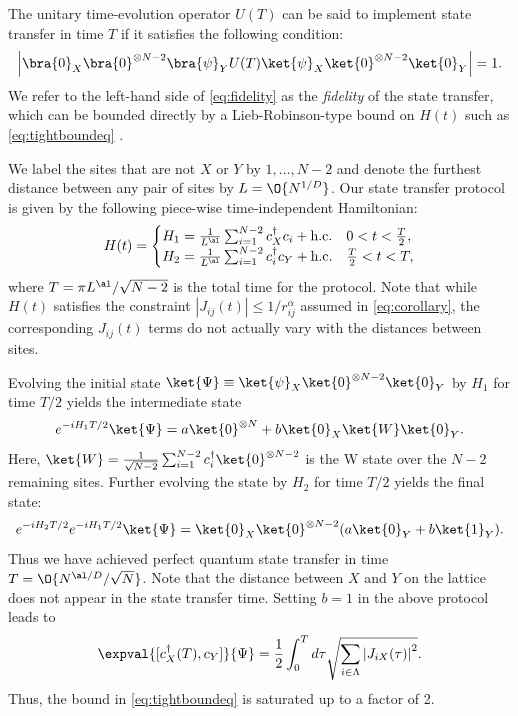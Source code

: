 The unitary time-evolution operator $U(T)$ can be said to implement state transfer in time $T$ if it satisfies the following condition:
\begin{align}
	\label{eq:fidelity}
	\left|\bra{0}_{X}\bra{0}^{\otimes N-2}\bra{\psi}_{Y} U(T)\ket{\psi}_{X}\ket{0}^{\otimes N-2}\ket{0}_{Y}\right| = 1.
 \end{align}
We refer to the left-hand side of \cref{eq:fidelity} as the \emph{fidelity} of the state transfer, which can be bounded directly by a Lieb-Robinson-type bound on $H(t)$ such as \cref{eq:tightboundeq} \cite{Epstein17}.

We label the sites that are not $X$ or $Y$ by $1,\dots,N-2$ and denote the furthest distance between any pair of sites by $L=\O{N^{1/D}}$. Our state transfer protocol is given by the following piece-wise time-independent Hamiltonian:
\begin{align}
\label{eq:protocol}
H(t)= \begin{cases}
	H_{1}=\frac{1}{L^{\al}} \sum_{i=1}^{N-2} c_{X}^{\dagger}c_{i}+\text{h.c.} & 0<t<\frac{T}{2},\\
	H_{2}=\frac{1}{L^{\al}} \sum_{i=1}^{N-2} c_{i}^{\dagger}c_{Y}+\text{h.c.} & \frac{T}{2}<t<T,
\end{cases}
\end{align}
where $T=\pi L^{\al}/\sqrt{N-2}$ is the total time for the protocol. Note that while $H(t)$ satisfies the constraint $|J_{ij}(t)|\le 1/r_{ij}^{\alpha}$ assumed in \cref{eq:corollary}, the corresponding $J_{ij}(t)$ terms do not actually vary with the distances between sites.

Evolving the initial state
$\ket{\Psi} \equiv \ket{\psi}_{X}\ket{0}^{\otimes N-2}\ket{0}_{Y}$  by $H_1$ for time $T/2$ yields the intermediate state
\begin{equation}
	e^{-i H_1 T/2}\ket{\Psi}= a \ket{0}^{\otimes N} + b\ket{0}_{X}\ket{W}\ket{0}_{Y}.
\end{equation}
Here, $\ket{W}= \frac{1}{\sqrt{N-2}}\sum_{i=1}^{N-2} c_{i}^{\dagger}\ket{0}^{\otimes N-2}$ is the W state over the $N-2$ remaining sites. Further evolving the state by $H_2$ for time $T/2$ yields the final state:
\begin{equation}
	e^{-i H_2 T/2}e^{-i H_1 T/2}\ket{\Psi}= \ket{0}_{X}\ket{0}^{\otimes N-2}(a \ket{0}_{Y}+ b\ket{1}_{Y}).
\end{equation}
Thus we have achieved perfect quantum state transfer in time $T = \O{N^{\al/D}/\sqrt{N}}$.
Note that the distance between $X$ and $Y$ on the lattice does not appear in the state transfer time.
    Setting $b=1$ in the above protocol leads to
\begin{equation}
    \expval{[c^\dagger_{X}(T),c_{Y}]}{\Psi} = \frac{1}{2}\int_{0}^{T}d\tau\sqrt{\sum_{i\in\Lambda}\left|J_{iX}(\tau)\right|^{2}}.
\end{equation}
Thus, the bound in \cref{eq:tightboundeq} is saturated up to a factor of 2.

